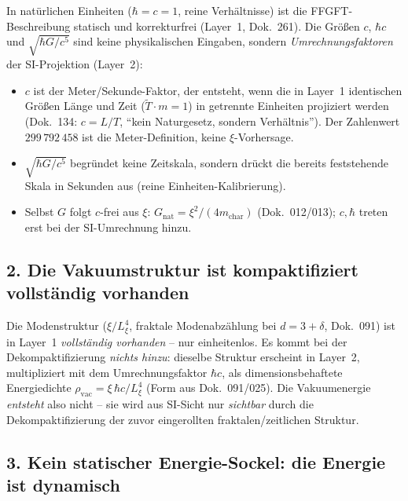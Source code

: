 In natürlichen Einheiten ($\hbar=c=1$, reine Verhältnisse) ist die
FFGFT-Beschreibung statisch und korrekturfrei (Layer~1, Dok.~261). Die
Größen $c$, $\hbar c$ und $\sqrt{\hbar G/c^5}$ sind keine physikalischen
Eingaben, sondern \emph{Umrechnungsfaktoren} der SI-Projektion (Layer~2):
\begin{itemize}
  \item $c$ ist der Meter/Sekunde-Faktor, der entsteht, wenn die in Layer~1
        identischen Größen Länge und Zeit ($\tilde T\cdot m=1$) in getrennte
        Einheiten projiziert werden (Dok.~134: $c=L/T$, \enquote{kein
        Naturgesetz, sondern Verhältnis}). Der Zahlenwert $299\,792\,458$
        ist die Meter-Definition, keine $\xi$-Vorhersage.
  \item $\sqrt{\hbar G/c^5}$ begründet keine Zeitskala, sondern drückt die
        bereits feststehende Skala in Sekunden aus (reine Einheiten-Kalibrierung).
  \item Selbst $G$ folgt $c$-frei aus $\xi$: $G_{\text{nat}}=\xi^2/(4m_{\text{char}})$
        (Dok.~012/013); $c,\hbar$ treten erst bei der SI-Umrechnung hinzu.
\end{itemize}

\subsection*{2. Die Vakuumstruktur ist kompaktifiziert vollständig vorhanden}

Die Modenstruktur ($\xi/L_\xi^4$, fraktale Modenabzählung bei $d=3+\delta$,
Dok.~091) ist in Layer~1 \emph{vollständig vorhanden} -- nur einheitenlos.
Es kommt bei der Dekompaktifizierung \emph{nichts hinzu}: dieselbe Struktur
erscheint in Layer~2, multipliziert mit dem Umrechnungsfaktor $\hbar c$, als
dimensionsbehaftete Energiedichte $\rho_{\text{vac}}=\xi\,\hbar c/L_\xi^4$
(Form aus Dok.~091/025). Die Vakuumenergie \emph{entsteht} also nicht --
sie wird aus SI-Sicht nur \emph{sichtbar} durch die Dekompaktifizierung der
zuvor eingerollten fraktalen/zeitlichen Struktur.

\subsection*{3. Kein statischer Energie-Sockel: die Energie ist dynamisch}

